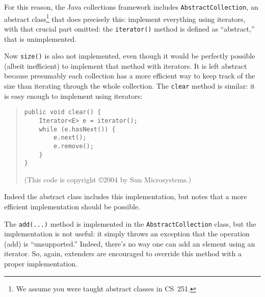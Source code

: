 \documentclass[11pt]{article}
\newcommand{\ie}{{i.e.}}
\begin{document}
For this reason, the Java collections framework includes
\verb|AbstractCollection|,
an abstract class\footnote{We assume you were taught abstract classes
  in CS~251.}
that does precisely this: implement
everything using iterators, with that crucial part omitted:
the \verb|iterator()| method is defined as ``abstract,'' that is
unimplemented.

Now \verb|size()| is also not implemented, even though it would be
perfectly possible (albeit inefficient) to implement that method with
iterators.  It is left abstract because presumably each collection has
a more efficient way to keep track of the size than iterating through
the whole collection.
The \verb|clear| method is similar: it is easy enough to implement
using iterators:
\begin{quote}
\begin{verbatim}
public void clear() {
    Iterator<E> e = iterator();
    while (e.hasNext()) {
        e.next();
        e.remove();
    }
}
\end{verbatim}
(This code is copyright \copyright 2004 by Sun Microsystems.)
\end{quote}
Indeed the abstract class includes this implementation, but notes that
a more efficient implementation should be possible.

The \verb|add(...)| method is implemented in the
\verb|AbstractCollection| class, but the implementation is not
useful: it simply throws an exception that the operation (add) is
``unsupported.''  Indeed, there's no way one can add an element using
an iterator.  So, again, extenders are encouraged to override this
method with a proper implementation.


\end{document}
